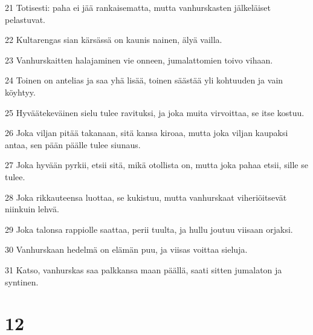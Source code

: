 \par 21 Totisesti: paha ei jää rankaisematta, mutta vanhurskasten jälkeläiset pelastuvat.
\par 22 Kultarengas sian kärsässä on kaunis nainen, älyä vailla.
\par 23 Vanhurskaitten halajaminen vie onneen, jumalattomien toivo vihaan.
\par 24 Toinen on antelias ja saa yhä lisää, toinen säästää yli kohtuuden ja vain köyhtyy.
\par 25 Hyväätekeväinen sielu tulee ravituksi, ja joka muita virvoittaa, se itse kostuu.
\par 26 Joka viljan pitää takanaan, sitä kansa kiroaa, mutta joka viljan kaupaksi antaa, sen pään päälle tulee siunaus.
\par 27 Joka hyvään pyrkii, etsii sitä, mikä otollista on, mutta joka pahaa etsii, sille se tulee.
\par 28 Joka rikkauteensa luottaa, se kukistuu, mutta vanhurskaat viheriöitsevät niinkuin lehvä.
\par 29 Joka talonsa rappiolle saattaa, perii tuulta, ja hullu joutuu viisaan orjaksi.
\par 30 Vanhurskaan hedelmä on elämän puu, ja viisas voittaa sieluja.
\par 31 Katso, vanhurskas saa palkkansa maan päällä, saati sitten jumalaton ja syntinen.

\chapter{12}

